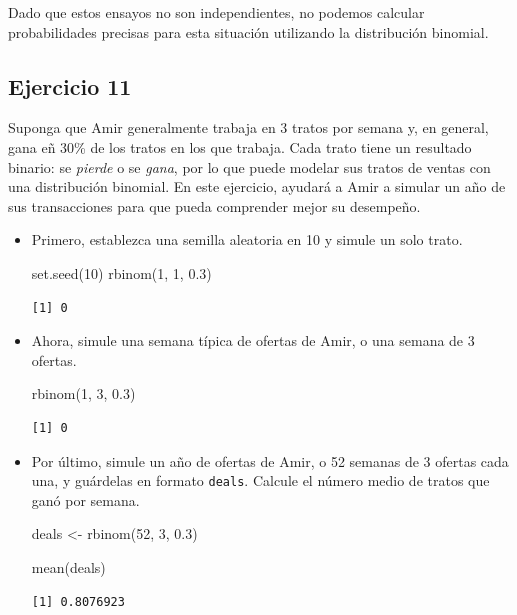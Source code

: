 \documentclass[
  letterpaper,
  DIV=11,
  numbers=noendperiod]{scrreprt}
\newenvironment{Shaded}{\begin{snugshade}}{\end{snugshade}}
\newcommand{\DecValTok}[1]{\textcolor[rgb]{0.68,0.00,0.00}{#1}}
\newcommand{\FloatTok}[1]{\textcolor[rgb]{0.68,0.00,0.00}{#1}}
\newcommand{\FunctionTok}[1]{\textcolor[rgb]{0.28,0.35,0.67}{#1}}
\newcommand{\NormalTok}[1]{\textcolor[rgb]{0.00,0.23,0.31}{#1}}
\newcommand{\OtherTok}[1]{\textcolor[rgb]{0.00,0.23,0.31}{#1}}
\begin{document}
Dado que estos ensayos no son independientes, no podemos calcular
probabilidades precisas para esta situación utilizando la distribución
binomial.

\hypertarget{ejercicio-11}{%
\subsection{Ejercicio 11}\label{ejercicio-11}}

Suponga que Amir generalmente trabaja en 3 tratos por semana y, en
general, gana eñ 30\% de los tratos en los que trabaja. Cada trato tiene
un resultado binario: se \emph{pierde} o se \emph{gana}, por lo que
puede modelar sus tratos de ventas con una distribución binomial. En
este ejercicio, ayudará a Amir a simular un año de sus transacciones
para que pueda comprender mejor su desempeño.

\begin{itemize}
\item
  Primero, establezca una semilla aleatoria en 10 y simule un solo
  trato.

\begin{Shaded}
\begin{Highlighting}[]
\FunctionTok{set.seed}\NormalTok{(}\DecValTok{10}\NormalTok{)}
\FunctionTok{rbinom}\NormalTok{(}\DecValTok{1}\NormalTok{, }\DecValTok{1}\NormalTok{, }\FloatTok{0.3}\NormalTok{)}
\end{Highlighting}
\end{Shaded}

\begin{verbatim}
[1] 0
\end{verbatim}
\item
  Ahora, simule una semana típica de ofertas de Amir, o una semana de 3
  ofertas.

\begin{Shaded}
\begin{Highlighting}[]
\FunctionTok{rbinom}\NormalTok{(}\DecValTok{1}\NormalTok{, }\DecValTok{3}\NormalTok{, }\FloatTok{0.3}\NormalTok{)}
\end{Highlighting}
\end{Shaded}

\begin{verbatim}
[1] 0
\end{verbatim}
\item
  Por último, simule un año de ofertas de Amir, o 52 semanas de 3
  ofertas cada una, y guárdelas en formato \texttt{deals}. Calcule el
  número medio de tratos que ganó por semana.

\begin{Shaded}
\begin{Highlighting}[]
\NormalTok{deals }\OtherTok{\textless{}{-}} \FunctionTok{rbinom}\NormalTok{(}\DecValTok{52}\NormalTok{, }\DecValTok{3}\NormalTok{, }\FloatTok{0.3}\NormalTok{)}

\FunctionTok{mean}\NormalTok{(deals)}
\end{Highlighting}
\end{Shaded}

\begin{verbatim}
[1] 0.8076923
\end{verbatim}
\end{itemize}
\end{document}
